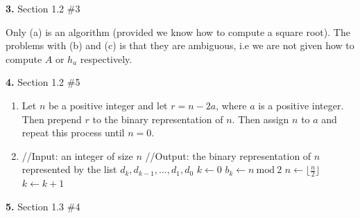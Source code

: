 \documentclass[letterpaper, 11pt]{article}
\newcommand{\hwnumber}[3]{\medskip \noindent\textbf{#1.} Section #2 \##3 \smallskip}
\newcommand{\Mod}[1]{\ \mathrm{mod}\ #1}
\begin{document}
\newpage

\hwnumber{3}{1.2}{3}

Only (a) is an algorithm (provided we know how to compute a square root). The
problems with (b) and (c) is that they are ambiguous, i.e we are not given how
to compute $A$ or $h_a$ respectively. 

\hwnumber{4}{1.2}{5}

\begin{enumerate}[label = (\alph*)]
  \item Let $n$ be a positive integer and let $r = n - 2a$, where $a$ is 
    a positive integer. Then prepend $r$ to the binary representation of 
    $n$. Then assign $n$ to $a$ and repeat this process until $n = 0$. 

  \item 
    \begin{algorithmic}
      \State //Input: an integer of size $n$
      \State //Output: the binary representation of $n$ represented by the list 
      $d_k, d_{k-1}, \dots, d_1, d_0$
      \State
      \State $k\gets 0$
        \State $b_k \gets n \Mod 2$
        \State $n \gets \lfloor \frac{n}{2} \rfloor$
        \State $k \gets k + 1$
      \EndWhile
    \end{algorithmic}


\end{enumerate}


\hwnumber{5}{1.3}{4}
\end{document}
